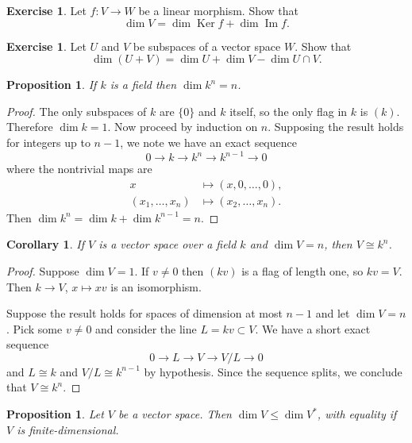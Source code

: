 \documentclass[11pt]{article}
\newtheorem{prop}[theo]{Proposition}
\newtheorem{coro}[theo]{Corollary}
\theoremstyle{definition}
\newtheorem{exer}[theo]{Exercise}
\DeclareMathOperator{\Ker}{Ker}
\DeclareMathOperator{\Img}{Im}
\begin{document}
\begin{exer}
Let $f : V \to W$ be a linear morphism.
Show that
\[
\dim V = \dim \Ker f + \dim \Img f.
\]
\end{exer}

\begin{exer}
Let $U$ and $V$ be subspaces of a vector space $W$.
Show that 
\[
\dim(U + V) = \dim U + \dim V - \dim U \cap V.
\]
\end{exer}


\begin{prop}
If $k$ is a field then $\dim k^n = n$.
\end{prop}

\begin{proof}
The only subspaces of $k$ are $\{0\}$ and $k$ itself, so the only flag in $k$ is $(k)$.
Therefore $\dim k = 1$.
Now proceed by induction on $n$.
Supposing the result holds for integers up to $n-1$, we note we have an exact sequence
\[
0 \longrightarrow
k \longrightarrow
k^n \longrightarrow
k^{n-1} \longrightarrow
0
\]
where the nontrivial maps are 
\begin{align*}
x &\mapsto (x, 0, \ldots, 0),
\\
(x_1, \ldots, x_n) &\mapsto (x_2, \ldots, x_n).
\end{align*}
Then $\dim k^n = \dim k + \dim k^{n-1} = n$.
\end{proof}





\begin{coro}
If $V$ is a vector space over a field $k$ and $\dim V = n$, then $V \cong k^n$.
\end{coro}

\begin{proof}
Suppose $\dim V = 1$.
If $v \not= 0$ then $(kv)$ is a flag of length one, so $kv = V$.
Then $k \to V$, $x \mapsto xv$ is an isomorphism.

Suppose the result holds for spaces of dimension at most $n-1$ and let $\dim V = n$.
Pick some $v \not= 0$ and consider the line $L = kv \subset V$.
We have a short exact sequence
\[
0 \longrightarrow
L \longrightarrow
V \longrightarrow
V/L \longrightarrow
0
\]
and $L \cong k$ and $V/L \cong k^{n-1}$ by hypothesis.
Since the sequence splits, we conclude that $V \cong k^n$.
\end{proof}




\begin{prop}
Let $V$ be a vector space.
Then $\dim V \leq \dim V^*$, with equality if $V$ is finite-dimensional.
\end{prop}
\end{document}

